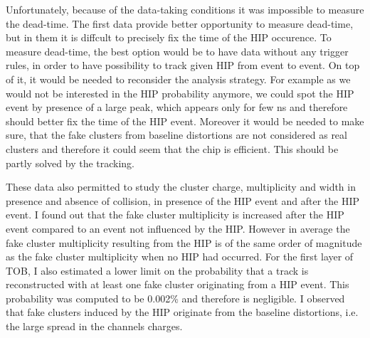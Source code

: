 Unfortunately, because of the data-taking conditions it was impossible to measure the dead-time. The first data provide better opportunity to measure dead-time, but in them it is diffcult to precisely fix the time of the HIP occurence. To measure dead-time, the best option would be to have data without any trigger rules, in order to have possibility to track given HIP from event to event. On top of it, it would be needed to reconsider the analysis strategy. For example as we would not be interested in the HIP probability anymore, we could spot the HIP event by presence of a large peak, which appears only for few ns and therefore should better fix the time of the HIP event. Moreover it would be needed to make sure, that the fake clusters from baseline distortions are not considered as real clusters and therefore it could seem that the chip is efficient. This should be partly solved by the tracking. 

These data also permitted to study the cluster charge, multiplicity and width in presence and absence of collision, in presence of the HIP event and after the HIP event. I found out that the fake cluster multiplicity is increased after the HIP event compared to an event not influenced by the HIP. However in average the fake cluster multiplicity resulting from the HIP is of the same order of magnitude as the fake cluster multiplicity when no HIP had occurred. For the first layer of TOB, I also estimated a lower limit on the probability that a track is reconstructed with at least one fake cluster originating from a HIP event. This probability was computed to be 0.002\% and therefore is negligible. I observed that fake clusters induced by the HIP originate from the baseline distortions, i.e. the large spread in the channels charges.



